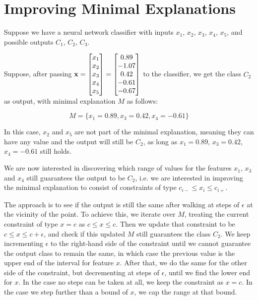 \documentclass[12pt]{article}
\begin{document}
\section{Improving Minimal Explanations}



Suppose we have a neural network classifier with inputs $x_1$, $x_2$, $x_3$, $x_4$, $x_5$, and possible outputs $C_1$, $C_2$, $C_3$.

Suppose, after passing $\vb{x} = \begin{bmatrix} x_1 \\ x_2 \\ x_3 \\ x_4 \\ x_5 \end{bmatrix} = \begin{bmatrix} 0.89 \\ -1.07 \\ 0.42 \\ -0.61 \\ -0.67 \end{bmatrix}$ to the classifier, we get the class $C_2$ as output, with minimal explanation $M$ as follows:

\[
M = \{x_1 = 0.89, x_3 = 0.42, x_4 = -0.61\}
\]

In this case, $x_2$ and $x_5$ are not part of the minimal explanation, meaning they can have any value and the output will still be $C_2$, as long as $x_1 = 0.89$, $x_3 = 0.42$, $x_4 = -0.61$ still holds.

We are now interested in discovering which range of values for the features $x_1$, $x_3$ and $x_4$ still guarantees the output to be $C_2$, i.e. we are interested in improving the minimal explanation to consist of constraints of type $c_{i-} \le x_i \le c_{i+}$.

The approach is to see if the output is still the same after walking at steps of $\epsilon$ at the vicinity of the point.
To achieve this, we iterate over $M$, treating the current constraint of type $x = c$ as $c \le x \le c$.
Then we update that constraint to be $c \le x \le c + \epsilon$, and check if this updated $M$ still guarantees the class $C_2$.
We keep incrementing $\epsilon$ to the right-hand side of the constraint until we cannot guarantee the output class to remain the same, in which case the previous value is the upper end of the interval for feature $x$.
After that, we do the same for the other side of the constraint, but decrementing at steps of $\epsilon$, until we find the lower end for $x$.
In the case no steps can be taken at all, we keep the constraint as $x = c$.
In the case we step further than a bound of $x$, we cap the range at that bound.
\end{document}
